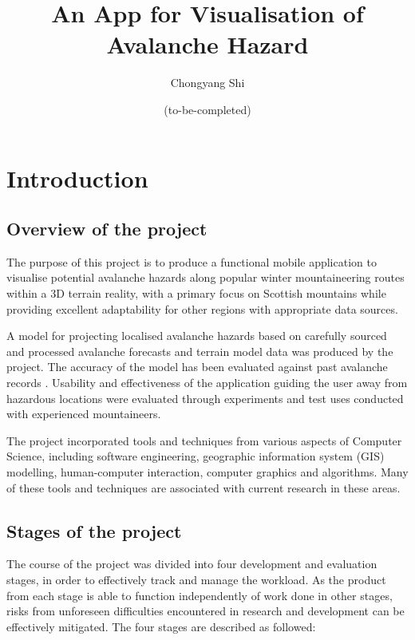 \documentclass[openany]{UoYCSproject}
\title{An App for Visualisation of Avalanche Hazard}
\author{Chongyang Shi}
\date{(to-be-completed)}
\begin{document}
{\let\cleardoublepage\clearpage 
    \maketitle
}

\chapter{Introduction}

\section{Overview of the project}

The purpose of this project is to produce a functional mobile application to visualise potential avalanche hazards along popular winter mountaineering routes within a 3D terrain reality, with a primary focus on Scottish mountains while providing excellent adaptability for other regions with appropriate data sources. 

A model for projecting localised avalanche hazards based on carefully sourced and processed avalanche forecasts \cite{sais} and terrain model data \cite{os-5} was produced by the project. The accuracy of the model has been evaluated against past avalanche records \cite[pp. 143-151]{scottish-avalanches}\cite{sais-map}. Usability and effectiveness of the application guiding the user away from hazardous locations were evaluated through experiments and test uses conducted with experienced mountaineers.

The project incorporated tools and techniques from various aspects of Computer Science, including software engineering, geographic information system (GIS) modelling, human-computer interaction, computer graphics and algorithms. Many of these tools and techniques are associated with current research in these areas.

\section{Stages of the project}

The course of the project was divided into four development and evaluation stages, in order to effectively track and manage the workload. As the product from each stage is able to function independently of work done in other stages, risks from unforeseen difficulties encountered in research and development can be effectively mitigated. The four stages are described as followed:
\end{document}
